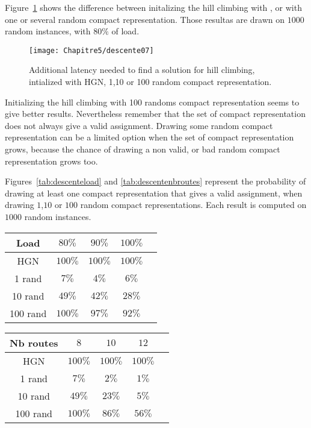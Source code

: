 Figure~\ref{fig:descente07} shows the difference between initalizing the hill climbing with \hybridgreedynormalized, or with one or several random compact representation. Those resultas are drawn on $1000$ random instances, with $80\%$ of load.
\begin{figure}[h] 
	\centering
	\texttt{[image: Chapitre5/descente07]}
\caption{ Additional latency needed to find a solution for hill climbing, intialized with HGN, 1,10 or 100 random compact representation.}
\label{fig:descente07}
\end{figure}
Initializing the hill climbing with 100 randoms compact representation seems to give better results. Nevertheless remember that the set of compact representation does not always give a valid assignment. Drawing some random compact representation can be a limited option when the set of compact representation grows, because the chance of drawing a non valid, or bad random compact representation grows too.

Figures~\ref{tab:descenteload} and \ref{tab:descentenbroutes} represent the probability of drawing at least one compact representation that gives a valid assignment, when drawing $1$,$10$ or $100$ random compact representations. Each result is computed on $1000$ random instances.

\begin{minipage}[c]{.45\linewidth}
\vspace{-0.4cm}
\begin{tabular}{ |c|c|c|c|c| }
\hline
    Load & $80\%$& $90\%$ & $100\%$\\
    \hline
    HGN & $100\%$ & $100\%$& $100\%$ \\
    1 rand & $7\%$ & $4\%$& $6\%$\\
   10 rand & $49\%$& $42\%$& $28\%$\\
   100 rand & $100\%$ & $97\%$& $92\%$\\
    \hline
 \end{tabular}
 \label{tab:descenteload}
\vfill
 \end{minipage}
 \hfill
\begin{minipage}[c]{.45\linewidth}
\vfill
\begin{tabular}{ |c|c|c|c|c| }
\hline
    Nb routes & $8$& $10$ & $12$\\
    \hline
    HGN & $100\%$ & $100\%$& $100\%$ \\
    1 rand & $7\%$ & $2\%$& $1\%$\\
   10 rand & $49\%$& $23\%$& $5\%$\\
   100 rand & $100\%$ & $86\%$& $56\%$\\
    \hline
 \end{tabular}
 \label{tab:descentenbroutes}
\vfill
\end{minipage}

